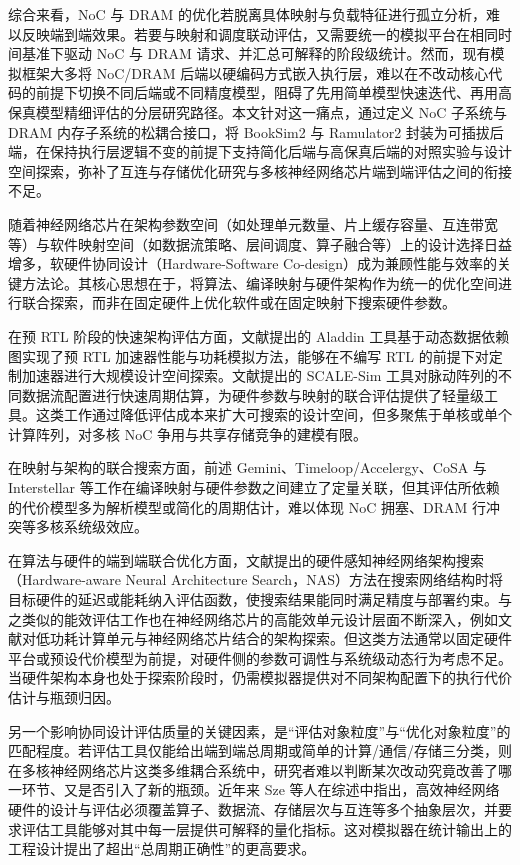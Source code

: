 综合来看，NoC 与 DRAM 的优化若脱离具体映射与负载特征进行孤立分析，难以反映端到端效果。若要与映射和调度联动评估，又需要统一的模拟平台在相同时间基准下驱动 NoC 与 DRAM 请求、并汇总可解释的阶段级统计。然而，现有模拟框架大多将 NoC/DRAM 后端以硬编码方式嵌入执行层，难以在不改动核心代码的前提下切换不同后端或不同精度模型，阻碍了先用简单模型快速迭代、再用高保真模型精细评估的分层研究路径。本文针对这一痛点，通过定义 NoC 子系统与 DRAM 内存子系统的松耦合接口，将 BookSim2 与 Ramulator2 封装为可插拔后端，在保持执行层逻辑不变的前提下支持简化后端与高保真后端的对照实验与设计空间探索，弥补了互连与存储优化研究与多核神经网络芯片端到端评估之间的衔接不足。


随着神经网络芯片在架构参数空间（如处理单元数量、片上缓存容量、互连带宽等）与软件映射空间（如数据流策略、层间调度、算子融合等）上的设计选择日益增多，软硬件协同设计（Hardware-Software Co-design）成为兼顾性能与效率的关键方法论。其核心思想在于，将算法、编译映射与硬件架构作为统一的优化空间进行联合探索，而非在固定硬件上优化软件或在固定映射下搜索硬件参数。

在预 RTL 阶段的快速架构评估方面，文献\parencite{shao2014aladdin}提出的 Aladdin 工具基于动态数据依赖图实现了预 RTL 加速器性能与功耗模拟方法，能够在不编写 RTL 的前提下对定制加速器进行大规模设计空间探索。文献\parencite{samajdar2020scalesim}提出的 SCALE-Sim 工具对脉动阵列的不同数据流配置进行快速周期估算，为硬件参数与映射的联合评估提供了轻量级工具。这类工作通过降低评估成本来扩大可搜索的设计空间，但多聚焦于单核或单个计算阵列，对多核 NoC 争用与共享存储竞争的建模有限。

在映射与架构的联合搜索方面，前述 Gemini、Timeloop/Accelergy、CoSA 与 Interstellar 等工作在编译映射与硬件参数之间建立了定量关联，但其评估所依赖的代价模型多为解析模型或简化的周期估计，难以体现 NoC 拥塞、DRAM 行冲突等多核系统级效应。

在算法与硬件的端到端联合优化方面，文献\parencite{wu2019fbnet}提出的硬件感知神经网络架构搜索（Hardware-aware Neural Architecture Search，NAS）方法在搜索网络结构时将目标硬件的延迟或能耗纳入评估函数，使搜索结果能同时满足精度与部署约束。与之类似的能效评估工作也在神经网络芯片的高能效单元设计层面不断深入，例如文献\parencite{soma2024}对低功耗计算单元与神经网络芯片结合的架构探索。但这类方法通常以固定硬件平台或预设代价模型为前提，对硬件侧的参数可调性与系统级动态行为考虑不足。当硬件架构本身也处于探索阶段时，仍需模拟器提供对不同架构配置下的执行代价估计与瓶颈归因。

另一个影响协同设计评估质量的关键因素，是“评估对象粒度”与“优化对象粒度”的匹配程度。若评估工具仅能给出端到端总周期或简单的计算/通信/存储三分类，则在多核神经网络芯片这类多维耦合系统中，研究者难以判断某次改动究竟改善了哪一环节、又是否引入了新的瓶颈。近年来 Sze 等人在综述中指出\cite{sze2017efficient}，高效神经网络硬件的设计与评估必须覆盖算子、数据流、存储层次与互连等多个抽象层次，并要求评估工具能够对其中每一层提供可解释的量化指标。这对模拟器在统计输出上的工程设计提出了超出“总周期正确性”的更高要求。

